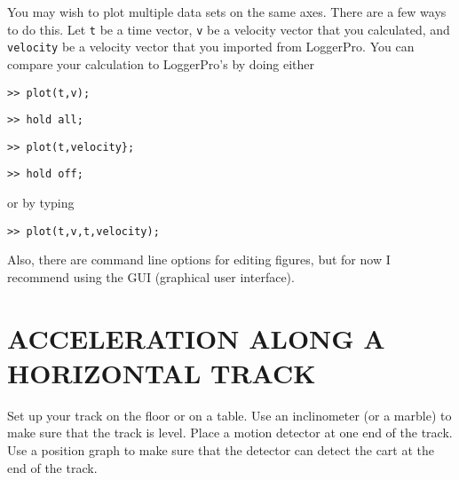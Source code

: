 \documentclass[11pt,letterpaper]{article}
\newcounter{question}[section]
\begin{document}
\begin{itemize}
You may wish to plot multiple data sets on the same axes. There are a few ways to do this. Let \verb+t+ be a time vector, \verb+v+ be a velocity vector that you calculated, and \verb+velocity+ be a velocity vector that you imported from LoggerPro. You can compare your calculation to LoggerPro's by doing either
\begin{verbatim}>> plot(t,v);\end{verbatim}
\begin{verbatim}>> hold all;\end{verbatim}
\begin{verbatim}>> plot(t,velocity};\end{verbatim}
\begin{verbatim}>> hold off;\end{verbatim}
or by typing
\begin{verbatim}>> plot(t,v,t,velocity);\end{verbatim}

Also, there are command line options for editing figures, but for now I recommend using the GUI (graphical user interface).

\end{itemize}

\section{ACCELERATION ALONG A HORIZONTAL TRACK}
Set up your track on the floor or on a table. Use an inclinometer (or a marble) to make sure that the track is level. Place a motion detector at one end of the track. Use a position graph to make sure that the detector can detect the cart at the end of the track.

\end{document}
